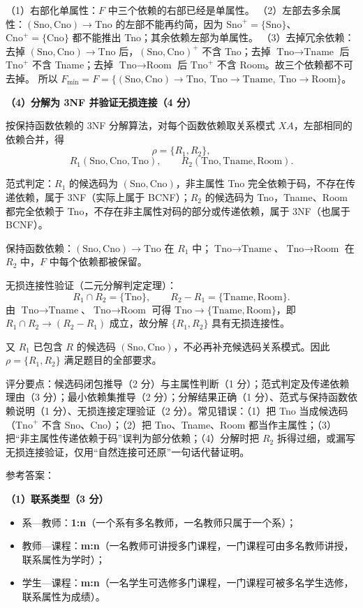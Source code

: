 \documentclass[a4paper,11pt]{article}
\begin{document}
（1）右部化单属性：$F$ 中三个依赖的右部已经是单属性。
（2）左部去多余属性：$(\text{Sno},\text{Cno})\to\text{Tno}$ 的左部不能再约简，因为 $\text{Sno}^{+}=\{\text{Sno}\}$、$\text{Cno}^{+}=\{\text{Cno}\}$ 都不能推出 Tno；其余依赖左部为单属性。
（3）去掉冗余依赖：去掉 $(\text{Sno},\text{Cno})\to\text{Tno}$ 后，$(\text{Sno},\text{Cno})^{+}$ 不含 Tno；去掉 $\text{Tno}\to\text{Tname}$ 后 $\text{Tno}^{+}$ 不含 Tname；去掉 $\text{Tno}\to\text{Room}$ 后 $\text{Tno}^{+}$ 不含 Room。故三个依赖都不可去掉。
所以 $F_{\min}=F=\{(\text{Sno},\text{Cno})\to\text{Tno},\ \text{Tno}\to\text{Tname},\ \text{Tno}\to\text{Room}\}$。

\textbf{（4）分解为 3NF 并验证无损连接（4 分）}

按保持函数依赖的 3NF 分解算法，对每个函数依赖取关系模式 $XA$，左部相同的依赖合并，得
\[
\rho=\{R_1,R_2\},
\]
\[
R_1(\text{Sno},\text{Cno},\text{Tno}),\qquad R_2(\text{Tno},\text{Tname},\text{Room}).
\]

范式判定：$R_1$ 的候选码为 $(\text{Sno},\text{Cno})$，非主属性 Tno 完全依赖于码，不存在传递依赖，属于 3NF（实际上属于 BCNF）；$R_2$ 的候选码为 Tno，Tname、Room 都完全依赖于 Tno，不存在非主属性对码的部分或传递依赖，属于 3NF（也属于 BCNF）。

保持函数依赖：$(\text{Sno},\text{Cno})\to\text{Tno}$ 在 $R_1$ 中；$\text{Tno}\to\text{Tname}$、$\text{Tno}\to\text{Room}$ 在 $R_2$ 中，$F$ 中每个依赖都被保留。

无损连接性验证（二元分解判定定理）：
\[
R_1\cap R_2=\{\text{Tno}\},\qquad R_2-R_1=\{\text{Tname},\text{Room}\}.
\]
由 $\text{Tno}\to\text{Tname}$、$\text{Tno}\to\text{Room}$ 可得 $\text{Tno}\to\{\text{Tname},\text{Room}\}$，即 $R_1\cap R_2\to(R_2-R_1)$ 成立，故分解 $\{R_1,R_2\}$ 具有无损连接性。

又 $R_1$ 已包含 $R$ 的候选码 $(\text{Sno},\text{Cno})$，不必再补充候选码关系模式。因此 $\rho=\{R_1,R_2\}$ 满足题目的全部要求。
\begin{analysis}评分要点：候选码闭包推导（2 分）与主属性判断（1 分）；范式判定及传递依赖理由（3 分）；最小依赖集推导（2 分）；分解结果正确（1 分）、范式与保持函数依赖说明（1 分）、无损连接定理验证（2 分）。常见错误：（1）把 Tno 当成候选码（$\text{Tno}^{+}$ 不含 Sno、Cno）；（2）把 Tno、Tname、Room 都当作主属性；（3）把“非主属性传递依赖于码”误判为部分依赖；（4）分解时把 $R_2$ 拆得过细，或漏写无损连接验证，仅用“自然连接可还原”一句话代替证明。\end{analysis}

\q 参考答案：

\textbf{（1）联系类型（3 分）}
\begin{itemize}[leftmargin=1.6em, itemsep=1pt]
  \item 系—教师：\textbf{1:n}（一个系有多名教师，一名教师只属于一个系）；
  \item 教师—课程：\textbf{m:n}（一名教师可讲授多门课程，一门课程可由多名教师讲授，联系属性为学时）；
  \item 学生—课程：\textbf{m:n}（一名学生可选修多门课程，一门课程可被多名学生选修，联系属性为成绩）。
\end{itemize}
\end{document}
